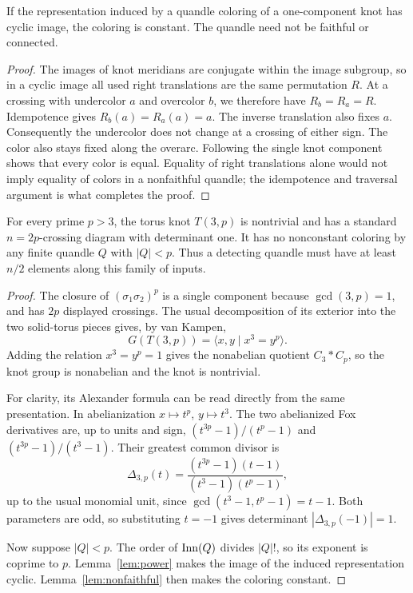 \begin{lemma}
\label{lem:nonfaithful}
If the representation induced by a quandle coloring of a one-component
knot has cyclic image, the coloring is constant. The quandle need not be
faithful or connected.
\end{lemma}
\begin{proof}
The images of knot meridians are conjugate within the image subgroup,
so in a cyclic image all used right translations are the same
permutation $R$. At a crossing with undercolor $a$ and overcolor $b$,
we therefore have $R_b=R_a=R$. Idempotence gives
$R_b(a)=R_a(a)=a$. The inverse translation also fixes $a$. Consequently
the undercolor does not change at a crossing of either sign. The color
also stays fixed along the overarc. Following the single knot component
shows that every color is equal. Equality of right translations alone
would not imply equality of colors in a nonfaithful quandle; the
idempotence and traversal argument is what completes the proof.
\end{proof}

\begin{theorem}
\label{thm:palette}
For every prime $p>3$, the torus knot $T(3,p)$ is nontrivial and has a
standard $n=2p$-crossing diagram with determinant one. It has no
nonconstant coloring by any finite quandle $Q$ with $|Q|<p$.
Thus a detecting quandle must have at least $n/2$ elements along this
family of inputs.
\end{theorem}
\begin{proof}
The closure of $(\sigma_1\sigma_2)^p$ is a single component because
$\gcd(3,p)=1$, and has $2p$ displayed crossings. The usual decomposition
of its exterior into the two solid-torus pieces gives, by van Kampen,
\[
 G(T(3,p))=\langle x,y\mid x^3=y^p\rangle.
\]
Adding the relation $x^3=y^p=1$ gives the nonabelian quotient
$C_3*C_p$, so the knot group is nonabelian and the knot is nontrivial.

For clarity, its Alexander formula can be read directly from the same
presentation. In abelianization $x\mapsto t^p$, $y\mapsto t^3$. The
two abelianized Fox derivatives are, up to units and sign,
$(t^{3p}-1)/(t^p-1)$ and $(t^{3p}-1)/(t^3-1)$. Their greatest common
divisor is
\[
 \Delta_{3,p}(t)=
 \frac{(t^{3p}-1)(t-1)}{(t^3-1)(t^p-1)},
\]
up to the usual monomial unit, since
$\gcd(t^3-1,t^p-1)=t-1$. Both parameters are odd, so substituting
$t=-1$ gives determinant $|\Delta_{3,p}(-1)|=1$.

Now suppose $|Q|<p$. The order of $\operatorname{Inn}(Q)$ divides $|Q|!$, so its
exponent is coprime to $p$. Lemma~\ref{lem:power} makes the image of
the induced representation cyclic. Lemma~\ref{lem:nonfaithful} then
makes the coloring constant.
\end{proof}

